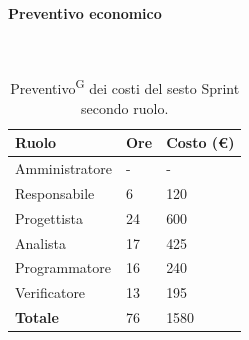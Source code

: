 \documentclass[8pt]{article}
\newcommand{\glossterm}[1]{#1\textsuperscript{G}} %
\newcommand{\subsubsubsection}[1]{\paragraph{#1}\mbox{}\\}
\begin{document}
\subsubsubsection{Preventivo economico}
\begin{table}[ht!]
	\centering
	\begin{tabular}{p{4cm} p{1cm} p{2cm}}
        \toprule
        \textbf{Ruolo} & \textbf{Ore} & \textbf{Costo (€)} \\
        \midrule
        Amministratore & -  & -   \\
        Responsabile   & 6  & 120 \\
        Progettista    & 24 & 600 \\
        Analista       & 17 & 425 \\
        Programmatore  & 16 & 240 \\
        Verificatore   & 13 & 195 \\
        \bottomrule
        \textbf{Totale} & 76 & 1580
    \end{tabular}
    \caption{\glossterm{Preventivo} dei costi del sesto Sprint secondo ruolo.}
	\label{table:Preventivo dei costi del sesto Sprint secondo ruolo}
\end{table}
\end{document}
